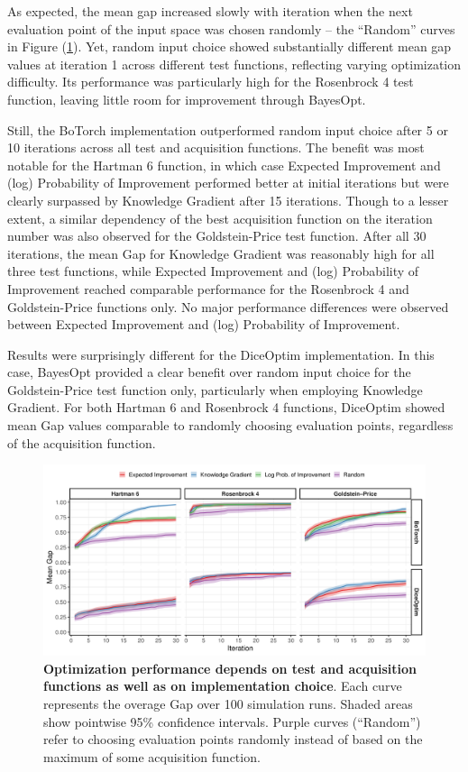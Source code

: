 As expected, the mean gap increased slowly with iteration when the next evaluation point of the input space was chosen randomly -- the ``Random'' curves in Figure (\ref{fig:gap}). Yet, random input choice showed substantially different mean gap values at iteration 1 across different test functions, reflecting varying optimization difficulty. Its performance was particularly high for the Rosenbrock 4 test function, leaving little room for improvement through BayesOpt.

Still, the BoTorch implementation outperformed random input choice after 5 or 10 iterations across all test and acquisition functions. The benefit was most notable for the Hartman 6 function, in which case Expected Improvement and (log) Probability of Improvement performed better at initial iterations but were clearly surpassed by Knowledge Gradient after 15 iterations. Though to a lesser extent, a similar dependency of the best acquisition function on the iteration number was also observed for the Goldstein-Price test function. After all 30 iterations, the mean Gap for Knowledge Gradient was reasonably high for all three test functions, while Expected Improvement and (log) Probability of Improvement reached comparable performance for the Rosenbrock 4 and Goldstein-Price functions only. No major performance differences were observed between Expected Improvement and (log) Probability of Improvement.

Results were surprisingly different for the DiceOptim implementation. In this case, BayesOpt provided a clear benefit over random input choice for the Goldstein-Price test function only, particularly when employing Knowledge Gradient. For both Hartman 6 and Rosenbrock 4 functions, DiceOptim showed mean Gap values comparable to randomly choosing evaluation points, regardless of the acquisition function.

\begin{figure}[H]
\includegraphics[width=0.99\linewidth]{output/gap_results.png}
\caption{\small \textbf{Optimization performance depends on test and acquisition functions as well as on implementation choice}. Each curve represents the overage Gap over 100 simulation runs. Shaded areas show pointwise 95\% confidence intervals. Purple curves (``Random'') refer to choosing evaluation points randomly instead of based on the maximum of some acquisition function.}
\label{fig:gap}
\end{figure}

